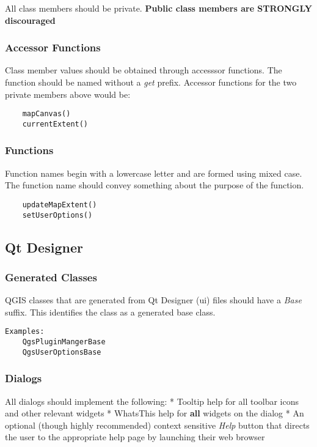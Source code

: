 All class members should be private.
\textbf{Public class members are STRONGLY discouraged}

\subsubsection{Accessor Functions}
Class member values should be obtained through accesssor functions. The function should be named without a \textit{get} prefix. Accessor functions for the two private members above would be: 

\begin{verbatim}
	mapCanvas()
	currentExtent()
\end{verbatim}

\subsubsection{Functions}
Function names begin with a lowercase letter and are formed using mixed case. The function name should convey something about the purpose of the function.

\begin{verbatim}
	updateMapExtent()
	setUserOptions()
\end{verbatim}

\subsection{Qt Designer}
\subsubsection{Generated Classes}
QGIS classes that are generated from Qt Designer (ui) files should have a \textit{Base} suffix. This identifies the class as a generated base class.

\begin{verbatim}
Examples:
	QgsPluginMangerBase
	QgsUserOptionsBase
\end{verbatim}
\subsubsection{Dialogs}
All dialogs should implement the following:
 * Tooltip help for all toolbar icons and other relevant widgets
 * WhatsThis help for \textbf{all} widgets on the dialog
 * An optional (though highly recommended) context sensitive \textit{Help} button that directs the user to the appropriate help page by launching their web browser

